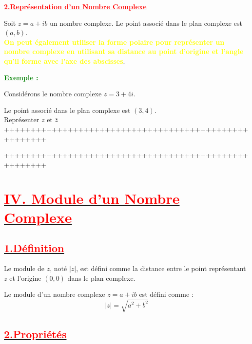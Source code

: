 \documentclass[12pt]{article}
\newcounter{exemple} %
\newcommand{\exemple}{%
  \refstepcounter{exemple}%
  \textbf{\textcolor{green}{Exemple \theexemple :}} \ignorespaces
}
\begin{document}
\underline{\textbf{\textcolor{red}{2.Représentation d'un Nombre Complexe}}}

Soit $z = a + ib$ un nombre complexe. Le point associé dans le plan complexe est $(a, b)$.\\
\textbf{\textcolor{yellow}{On peut également utiliser la forme polaire pour représenter un nombre complexe en utilisant sa distance au point d'origine et l'angle qu'il forme avec l'axe des abscisses}}.

\underline{\exemple}

Considérons le nombre complexe $z = 3 + 4i$. 

Le point associé dans le plan complexe est $(3, 4)$.\\
Représenter $z$ et $\overline{z}$\\

++++++++++++++++++++++++++++++++++++++++++++++++++++++



++++++++++++++++++++++++++++++++++++++++++++++++++++++

\section*{\underline{\textbf{\textcolor{red}{IV. Module d'un Nombre Complexe}}}}
\subsection*{\underline{\textbf{\textcolor{red}{1.Définition  }}}} 
Le module de $z$, noté $|z|$, est défini comme la distance entre le point représentant $z$ et l'origine $(0,0)$ dans le plan complexe.

Le module d'un nombre complexe $z = a + ib$ est défini comme :
\[ |z| = \sqrt{a^2 + b^2} \]

\subsection*{\underline{\textbf{\textcolor{red}{2.Propriétés}}}}
\end{document}

